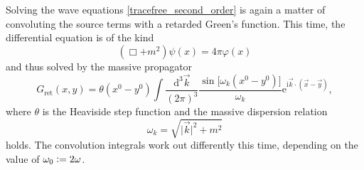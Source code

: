Solving the wave equations \eqref{tracefree_second_order} is again a matter of convoluting the source terms with a retarded Green's function. This time, the differential equation is of the kind
\begin{equation}
  (\Box + m^2)\psi(x) = 4\pi\varphi(x)
\end{equation}
and thus solved by the massive propagator \cite{}
\begin{equation}
  G_\text{ret}(x,y) = \theta(x^0-y^0)\int\frac{\mathrm d^3\vec k}{(2\pi)^3}\frac{\operatorname{sin}\lbrack\omega_k(x^0-y^0)\rbrack}{\omega_k} \mathrm e^{\mathrm i\vec k\cdot(\vec x-\vec y)},
\end{equation}
where $\theta$ is the Heaviside step function and the massive dispersion relation
\begin{equation}
  \omega_k = \sqrt{\lvert\vec k\rvert^2 + m^2}
\end{equation}
holds. The convolution integrals work out differently this time, depending on the value of $\omega_0 \vcentcolon= 2\omega$.

